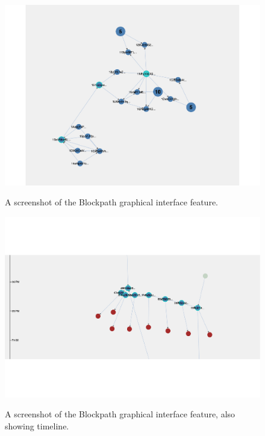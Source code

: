 \begin{figure}[h!]
  \centering
  \includegraphics[width = 15cm]{./figures/blockpath-evaluation}\\[0.5cm] 
  \caption{A screenshot of the Blockpath graphical interface feature.}
  \label{fig:blockpath-graph-ui}
\end{figure}

\begin{figure}[h!]
  \centering
  \includegraphics[width = 15cm]{./figures/blockpath-time-org}\\[0.5cm] 
  \caption{A screenshot of the Blockpath graphical interface feature, also showing timeline.}
  \label{fig:blockpath-graph-ui-time-organisation}
\end{figure}


